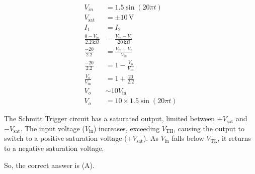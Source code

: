 \documentclass[journal,12pt,twocolumn]{IEEEtran}
\begin{document}
\begin{align}
V_{in} &= 1.5 \sin(20\pi t)\\
V_{\text{sat}} &= \pm 10 \, \text{V}\\
I_1 &= I_2\\
\frac{0 - V_{\text{in}}}{2.2 \, \text{k}\Omega} &= \frac{V_{\text{in}} - V_o}{20 \, \text{k}\Omega}\\
\frac{-20}{2.2} &= \frac{V_{\text{in}} - V_o}{V_{\text{in}}}\\
\frac{-20}{2.2} &= 1 - \frac{V_o}{V_{\text{in}}}\\
\frac{V_o}{V_{\text{in}}} &= 1 + \frac{20}{2.2}\\
V_o &\sim 10 V_{\text{in}}\\
V_o &= 10 \times 1.5 \sin(20\pi t)
\end{align}

The Schmitt Trigger circuit has a saturated output, limited between \( +V_{\text{sat}} \) and \( -V_{\text{sat}} \). The input voltage (\( V_{\text{in}} \)) increases, exceeding \( V_{\text{TH}} \), causing the output to switch to a positive saturation voltage (\( +V_{\text{sat}} \)). As \( V_{\text{in}} \) falls below \( V_{\text{TL}} \), it returns to a negative saturation voltage.

So, the correct answer is (A).
\end{document}
